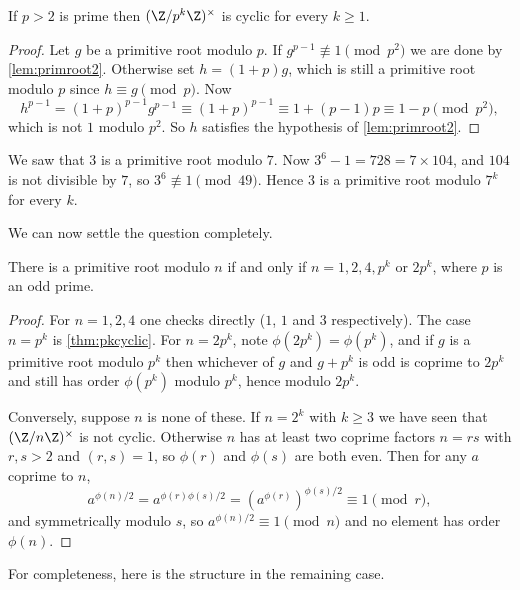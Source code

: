 \begin{theorem}\label{thm:pkcyclic}
	If $p > 2$ is prime then $(\Z/p^k\Z)^\times$ is cyclic for every $k \geq 1$.
\end{theorem}
\begin{proof}
	Let $g$ be a primitive root modulo $p$. If $g^{p-1} \not\equiv 1 \pmod{p^2}$ we are done by \autoref{lem:primroot2}. Otherwise set $h = (1 + p)g$, which is still a primitive root modulo $p$ since $h \equiv g \pmod p$. Now
	$$
	h^{p-1} = (1+p)^{p-1}g^{p-1} \equiv (1 + p)^{p-1} \equiv 1 + (p-1)p \equiv 1 - p \pmod{p^2},
	$$
	which is not $1$ modulo $p^2$. So $h$ satisfies the hypothesis of \autoref{lem:primroot2}.
\end{proof}

\begin{example}
	We saw that $3$ is a primitive root modulo $7$. Now $3^6 - 1 = 728 = 7 \times 104$, and $104$ is not divisible by $7$, so $3^6 \not\equiv 1 \pmod{49}$. Hence $3$ is a primitive root modulo $7^k$ for every $k$.
\end{example}

We can now settle the question completely.

\begin{theorem}
	There is a primitive root modulo $n$ if and only if $n = 1, 2, 4, p^k$ or $2p^k$, where $p$ is an odd prime.
\end{theorem}
\begin{proof}
	For $n = 1, 2, 4$ one checks directly ($1$, $1$ and $3$ respectively). The case $n = p^k$ is \autoref{thm:pkcyclic}. For $n = 2p^k$, note $\phi(2p^k) = \phi(p^k)$, and if $g$ is a primitive root modulo $p^k$ then whichever of $g$ and $g + p^k$ is odd is coprime to $2p^k$ and still has order $\phi(p^k)$ modulo $p^k$, hence modulo $2p^k$.

	Conversely, suppose $n$ is none of these. If $n = 2^k$ with $k \geq 3$ we have seen that $(\Z/n\Z)^\times$ is not cyclic. Otherwise $n$ has at least two coprime factors $n = rs$ with $r, s > 2$ and $(r,s) = 1$, so $\phi(r)$ and $\phi(s)$ are both even. Then for any $a$ coprime to $n$,
	$$
	a^{\phi(n)/2} = a^{\phi(r)\phi(s)/2} = \left(a^{\phi(r)}\right)^{\phi(s)/2} \equiv 1 \pmod r,
	$$
	and symmetrically modulo $s$, so $a^{\phi(n)/2} \equiv 1 \pmod n$ and no element has order $\phi(n)$.
\end{proof}

For completeness, here is the structure in the remaining case.

